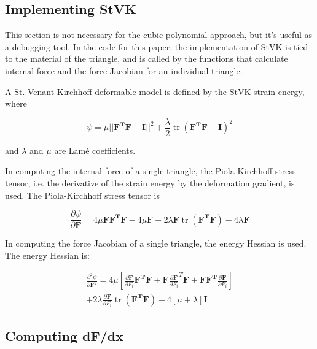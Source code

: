 \documentclass[twocolumn,10pt]{asme2ej}
\DeclareMathOperator{\tr}{tr}
\begin{document}
\subsection{Implementing StVK}

This section is not necessary for the cubic polynomial approach, but it's useful as a debugging tool. In the code
for this paper, the implementation of StVK is tied to the material of the triangle, and is called by the functions
that calculate internal force and the force Jacobian for an individual triangle.

A St. Venant-Kirchhoff deformable model is defined by the StVK strain energy, where

\begin{equation}
\psi = \mu ||\bm{F^TF} - \bm{I}||^2 + \frac{\lambda}{2}\tr (\bm{F^TF} - \bm{I})^2
\label{eq_stvk}
\end{equation}

\noindent and $\lambda$ and $\mu$ are Lamé coefficients.

In computing the internal force of a single triangle, the Piola-Kirchhoff stress tensor, i.e. the derivative of the strain energy by the deformation gradient, is used. The Piola-Kirchhoff stress tensor is

\begin{equation}
\frac{\partial \psi}{\partial \bm{F}} = 4\mu \bm{FF^TF} - 4\mu \bm{F} + 2\lambda \bm{F}\tr (\bm{F^TF}) -4\lambda \bm{F}
\label{eq_pk1}
\end{equation}

In computing the force Jacobian of a single triangle, the energy Hessian is used. The energy Hessian is:

\begin{equation}
  \begin{split}
\frac{\partial^2 \psi}{\partial \bm{F}^2} = 4\mu \left[\frac{\partial \bm{F}}{\partial F_i}\bm{F^TF} + \bm{F}\frac{\partial \bm{F}}{\partial F_i}^T\bm{F} + \bm{FF^T}\frac{\partial \bm{F}}{\partial F_i}\right] \\ + 2\lambda \frac{\partial \bm{F}}{\partial F_i}\tr \left(\bm{F^TF}\right) - 4[\mu + \lambda]\bm{I}
  \end{split}
\label{eq_dpdf}
\end{equation}

\subsection{Computing dF/dx}
\end{document}

